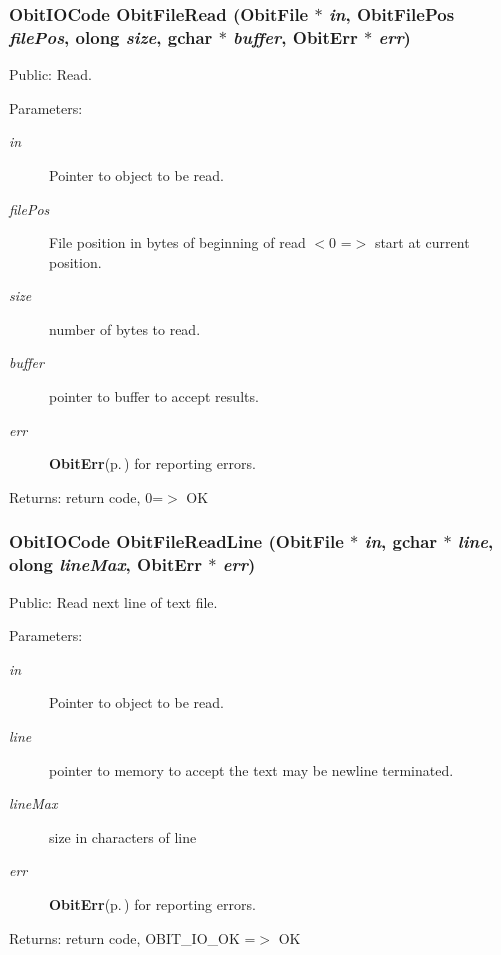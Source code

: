 \subsubsection{\setlength{\rightskip}{0pt plus 5cm}Obit\-IOCode Obit\-File\-Read ({\bf Obit\-File} $\ast$ {\em in}, {\bf Obit\-File\-Pos} {\em file\-Pos}, {\bf olong} {\em size}, gchar $\ast$ {\em buffer}, {\bf Obit\-Err} $\ast$ {\em err})}\label{ObitFile_8h_a33}


Public: Read. 

\begin{Desc}
\item[Parameters:]
\begin{description}
\item[{\em in}]Pointer to object to be read. \item[{\em file\-Pos}]File position in bytes of beginning of read $<$0 =$>$ start at current position. \item[{\em size}]number of bytes to read. \item[{\em buffer}]pointer to buffer to accept results. \item[{\em err}]{\bf Obit\-Err}{\rm (p.\,\pageref{structObitErr})} for reporting errors. \end{description}
\end{Desc}
\begin{Desc}
\item[Returns:]return code, 0=$>$ OK \end{Desc}
\subsubsection{\setlength{\rightskip}{0pt plus 5cm}Obit\-IOCode Obit\-File\-Read\-Line ({\bf Obit\-File} $\ast$ {\em in}, gchar $\ast$ {\em line}, {\bf olong} {\em line\-Max}, {\bf Obit\-Err} $\ast$ {\em err})}\label{ObitFile_8h_a34}


Public: Read next line of text file. 

\begin{Desc}
\item[Parameters:]
\begin{description}
\item[{\em in}]Pointer to object to be read. \item[{\em line}]pointer to memory to accept the text may be newline terminated. \item[{\em line\-Max}]size in characters of line \item[{\em err}]{\bf Obit\-Err}{\rm (p.\,\pageref{structObitErr})} for reporting errors. \end{description}
\end{Desc}
\begin{Desc}
\item[Returns:]return code, OBIT\_\-IO\_\-OK =$>$ OK \end{Desc}
